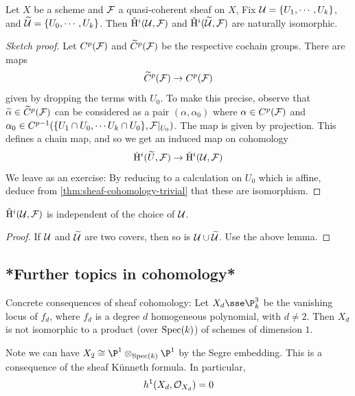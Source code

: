 \documentclass{article}
\begin{document}
\begin{lemma}
    Let \(X\) be a scheme and \(\mathcal{F}\) a quasi-coherent sheaf on \(X\), Fix \(\mathcal{U} = \{U_1, \cdots, U_k\}\), and \(\widetilde {\mathcal{U}} = \{U_0, \cdots, U_k\}\). Then \(\check {\mathrm{H}}^i(\mathcal{U}, \mathcal{F})\) and \(\check {\mathrm{H}}^i(\widetilde{\mathcal{U}}, \mathcal{F})\) are naturally isomorphic.
\end{lemma}

\begin{proof}
    [Sketch proof] Let \(C^p(\mathcal{F})\) and \(\widetilde C^p(\mathcal{F})\) be the respective cochain groups. There are maps
    \[\widetilde C^p(\mathcal{F}) \to C^p(\mathcal{F})\]
    given by dropping the terms with \(U_0\). To make this precise, observe that \(\widetilde \alpha \in \widetilde C^p(\mathcal{F})\) can be considered as a pair \((\alpha, \alpha_0)\) where \(\alpha \in C^p(\mathcal{F})\) and \(\alpha_0 \in C^{p-1}(\{U_1 \cap U_0, \cdots U_k\cap U_0\}, \mathcal{F}\vert_{U_0})\). The map is given by projection.
    This defines a chain map, and so we get an induced map on cohomology
    \[\check {\mathrm{H}}^i(\widetilde U, \mathcal{F}) \to \check {\mathrm{H}}^i(\mathcal{U}, \mathcal{F})\]
    We leave as an exercise: By reducing to a calculation on \(U_0\) which is affine, deduce from \cref{thm:sheaf-cohomology-trivial} that these are isomorphism.
\end{proof}

\begin{corollary}
    \(\check {\mathrm{H}}^i(\mathcal{U}, \mathcal{F})\) is independent of the choice of \(\mathcal{U}\).
\end{corollary}

\begin{proof}
    If \(\mathcal{U}\) and \(\widetilde {\mathcal{U}}\) are two covers, then so is \(\mathcal{U} \cup \widetilde {\mathcal{U}}\). Use the above lemma.
\end{proof}

\subsection{*Further topics in cohomology*}

Concrete consequences of sheaf cohomology: Let \(X_d \sse \P^3_k\) be the vanishing locus of \(f_d\), where \(f_d\) is a degree \(d\) homogeneous polynomial, with \(d \ne 2\). Then \(X_d\) is not isomorphic to a product (over \(\operatorname{Spec}(k)\)) of schemes of dimension \(1\).

Note we can have \(X_2 \cong \P^1\otimes_{\Spec(k)}\P^1\) by the Segre embedding. This is a consequence of the sheaf K\"unneth formula. In particular,
\[h^1(X_d, \mathcal{O}_{X_d}) = 0\]
\end{document}
